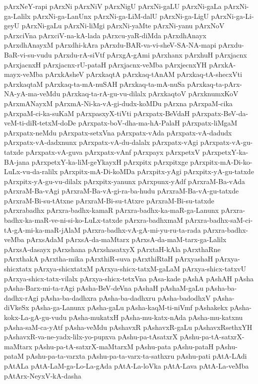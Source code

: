 {pArxNeY-rapi
pArxNi
pArxNiV
pArxNigU
pArxNi-gaLU
pArxNi-gaLa
pArxNi-ga-Lalilx
pArxNi-ga-LanUnx
pArxNi-ga-LiM-dalU
pArxNi-ga-LigU
pArxNi-ga-Li-geyU
pArxNi-gaLu
pArxNi-liMgi
pArxNi-yaMte
pArxNi-yanu
pArxNoV
pArxciVna
pArxciV-na-kA-lada
pArxcu-yaR-diMda
pArxdhAnayx
pArxdhAnayxM
pArxdhi-kAra
pArxdu-BAR-va-vi-sheV-SA-NA-mapi
pArxdu-BaR-vi-su-vudu
pArxdu-rA-siVtf
pArxgA-gAmi
pArxhanx
pArxhuH
pArxjacnx
pArxjacnxH
pArxjacnx-rU-pataH
pArxjacnx-veMba
pArxjecnxYH
pArxkA-mayx-veMba
pArxkAsheV
pArxkaqtA
pArxkaq-tAnAM
pArxkaq-tA-shecxVti
pArxkaqtaM
pArxkaq-ta-mA-nuSAH
pArxkaq-ta-mA-nuSa
pArxkaq-ta-pArx-NA-yA-ma-veMdu
pArxkaq-ta-rA-gu-vu-dilalx
pArxkaqtoV
pArxknumxKoV
pArxmANayxM
pArxmA-Ni-ka-vA-gi-dudx-koMDu
pArxna
pArxpaM-cika
pArxpaM-ci-ka-suKaM
pArxpasxyX-tiVti
pArxpatx-BeVdaH
pArxpatx-BeV-da-veM-ti-diR-tetxM-doDe
pArxpatx-boV-dha-ma-hA-PalaH
pArxpatx-liMgaM
pArxpatx-neMdu
pArxpatx-setxVna
pArxpatx-vAda
pArxpatx-vA-dadudx
pArxpatx-vA-dadxnunx
pArxpatx-vA-du-dalalx
pArxpatx-vAgi
pArxpatx-vA-gu-tatxde
pArxpatx-vA-guva
pArxpatx-vAnf
pArxpayx
pArxpetxV
pArxpetxY-ka-BA-jana
pArxpetxY-ka-liM-geYkayxH
pArxpitx
pArxpitxge
pArxpitx-mA-Di-ko-LuLx-vu-da-ralilx
pArxpitx-mA-Di-koMDa
pArxpitx-yAgi
pArxpitx-yA-gu-tatxde
pArxpitx-yA-gu-vu-dilalx
pArxpitx-yanunx
pArxpunx-yAdf
pArxraM-Ba-vAda
pArxraM-Ba-vAgi
pArxraM-Ba-vA-gi-ra-ba-hudu
pArxraM-Ba-vA-gu-tatxde
pArxraM-Bi-su-tAtxne
pArxraM-Bi-su-tAtxre
pArxraM-Bi-su-tatxde
pArxrabadhx
pArxra-badhx-kamaR
pArxra-badhx-ka-maR-ga-Lanunx
pArxra-badhx-ka-maR-ve-ni-si-ko-LuLx-tatxde
pArxra-badhxmaM
pArxra-badhx-saM-ci-tA-gA-mi-ka-maR-jAlaM
pArxra-badhx-vA-gA-mi-yu-ru-ta-rada
pArxra-badhx-veMba
pArxsAdaM
pArxsA-da-maMtarx
pArxsA-da-maM-tarx-ga-Lalilx
pArxsA-dasayx
pArxshana
pArxshasatxyX
pArxtaH-kAla
pArxthaRne
pArxthakA
pArxtha-mika
pArxthiR-suva
pArxthiRtaH
pArxyashaH
pArxya-shicxtatx
pArxya-shicxtatxM
pArxya-shicx-tatxM-gaLaM
pArxya-shicx-tatxvU
pArxya-shicx-tatx-vilalx
pArxya-shicx-tetxVna
pAsa-kade
pAshA
pAshAH
pAsha
pAsha-Barx-mi-ta-rAgi
pAsha-BeV-deVna
pAshaH
pAshaM-gaLu
pAsha-ba-dadhx-rAgi
pAsha-ba-dadhxra
pAsha-ba-dadhxru
pAsha-badodhxV
pAsha-diVkeSx
pAsha-ga-Lanunx
pAsha-gaLu
pAsha-kaqM-ti-niVmf
pAshakekx
pAsha-kokx-La-gA-gu-vudu
pAsha-mukatxH
pAsha-mu-katx-nAda
pAsha-mu-katxnu
pAsha-saM-ca-yAtf
pAsha-veMdu
pAshavxR
pAshavxR-gaLu
pAshavxRsethxYH
pAshavxR-va-ne-yadx-lilx-yo-pupxva
pAshu-pa-tAsatxrX
pAshu-pa-tA-satxrX-maMtarx
pAshu-pa-tA-satxrX-maMtarxM
pAshu-pata
pAshu-pataH
pAshu-pataM
pAshu-pa-ta-varxta
pAshu-pa-ta-varx-ta-sathxru
pAshu-pati
pAtA-LAdi
pAtALa
pAtA-LaM-ga-Lo-La-gAda
pAtA-La-loVka
pAtA-Lava
pAtA-La-veMba
pAtArx-NeyxV-kA-dasha
}
